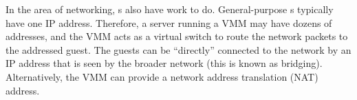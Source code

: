 In the area of networking, s also have work to do.
General-purpose s typically have one IP address.
Therefore, a server running a VMM may have dozens of addresses, and the VMM acts as a virtual switch to route the network packets to the addressed guest.
The guests can be ``directly'' connected to the network by an IP address that is seen by the broader network (this is known as bridging).
Alternatively, the VMM can provide a network address translation (NAT) address.


